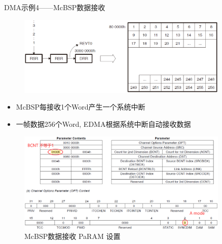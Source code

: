 \documentclass[10pt]{ctexbeamer}
\begin{document}
    \begin{frame}[allowframebreaks]{DMA示例4——McBSP数据接收}
        \begin{figure}
            \centering
            \includegraphics[width=0.9\textwidth]{summary/18.eps}
        \end{figure}
        \vspace{0.5cm}
        \begin{itemize}
            \item McBSP每接收1个Word产生一个系统中断
            \item 一帧数据256个Word, EDMA根据系统中断自动接收数据
        \end{itemize}
        
        \begin{figure}
            \centering
            \includegraphics[width=0.9\textwidth]{summary/19.eps}
            \caption{McBSP数据接收 PaRAM 设置}
        \end{figure}
    \end{frame}
\end{document}
